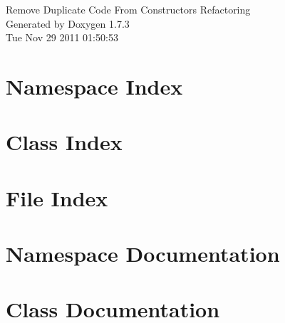 \documentclass[a4paper]{book}
\begin{document}
\hypersetup{pageanchor=false}
\begin{titlepage}
\vspace*{7cm}
\begin{center}
{\Large Remove Duplicate Code From Constructors Refactoring }\\
\vspace*{1cm}
{\large Generated by Doxygen 1.7.3}\\
\vspace*{0.5cm}
{\small Tue Nov 29 2011 01:50:53}\\
\end{center}
\end{titlepage}
\clearemptydoublepage
{}
\tableofcontents
\clearemptydoublepage
{}
\hypersetup{pageanchor=true}
\chapter{Namespace Index}

\chapter{Class Index}

\chapter{File Index}

\chapter{Namespace Documentation}





\chapter{Class Documentation}













\end{document}
